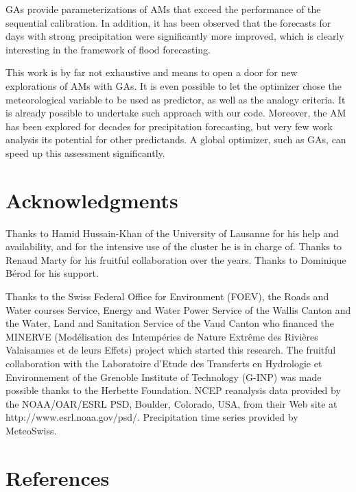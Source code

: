 \documentclass[5p]{elsarticle}
\begin{document}
GAs provide parameterizations of AMs that exceed the performance of the sequential calibration. In addition, it has been observed that the forecasts for days with strong precipitation were significantly more improved, which is clearly interesting in the framework of flood forecasting.

This work is by far not exhaustive and means to open a door for new explorations of AMs with GAs. It is even possible to let the optimizer chose the meteorological variable to be used as predictor, as well as the analogy criteria. It is already possible to undertake such approach with our code. Moreover, the AM has been explored for decades for precipitation forecasting, but very few work analysis its potential for other predictands. A global optimizer, such as GAs, can speed up this assessment significantly.


\section*{Acknowledgments}
Thanks to Hamid Hussain-Khan of the University of Lausanne for his help and availability, and for the intensive use of the cluster he is in charge of. Thanks to Renaud Marty for his fruitful collaboration over the years. Thanks to Dominique B\'{e}rod for his support.

Thanks to the Swiss Federal Office for Environment (FOEV), the Roads and Water courses Service, Energy and Water Power Service of the Wallis Canton and the Water, Land and Sanitation Service of the Vaud Canton who financed the MINERVE (Mod\'{e}lisation des Intemp\'{e}ries de Nature Extr\^{e}me des Rivi\`{e}res Valaisannes et de leurs Effets) project which started this research. The fruitful collaboration with the Laboratoire d'Etude des Transferts en Hydrologie et Environnement of the Grenoble Institute of Technology (G-INP) was made possible thanks to the Herbette Foundation. NCEP reanalysis data provided by the NOAA/OAR/ESRL PSD, Boulder, Colorado, USA, from their Web site at http://www.esrl.noaa.gov/psd/. Precipitation time series provided by MeteoSwiss. 


\section*{References}




\end{document}

